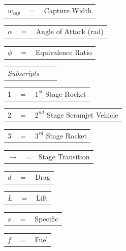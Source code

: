 \documentclass[]{aiaa-tc}
\begin{document}
	  	\begin{tabular}{p{1.2cm}p{1cm}p{5cm}}
	  $w_{cap}$ & $=$ & Capture Width\\
	  	\end{tabular} 
	  	\begin{tabular}{p{1.2cm}p{1cm}p{5cm}}
	  		$\alpha$ & $=$ & Angle of Attack (rad)\\
	  	\end{tabular} 	
	  	\begin{tabular}{p{1.2cm}p{1cm}p{5cm}}
	  		$\phi$ & $=$ & Equivalence Ratio\\
	  	\end{tabular} 
	  	\newline  	
	  	\begin{tabular}{p{5.2cm}p{1cm}p{5cm}}


\textit{Subscripts} \\
\end{tabular} 
\newline
\begin{tabular}{p{1.2cm}p{1cm}p{5cm}}
$1$ & $=$ & $1^{st}$ Stage Rocket\\
\end{tabular} 
\begin{tabular}{p{1.2cm}p{1cm}p{5cm}}
	$2$ & $=$ & $2^{nd}$ Stage Scramjet Vehicle\\
		\end{tabular} 
		\begin{tabular}{p{1.2cm}p{1cm}p{5cm}}
	$3$ & $=$ & $3^{rd}$ Stage Rocket\\
		\end{tabular} 
		\begin{tabular}{p{1.2cm}p{1cm}p{5cm}}
	$\rightarrow$ & = & Stage Transition\\
		\end{tabular} 
		\begin{tabular}{p{1.2cm}p{1cm}p{5cm}}
	$d$ & $=$ & Drag\\
		\end{tabular} 
		\begin{tabular}{p{1.2cm}p{1cm}p{5cm}}
	$L$ & $=$ & Lift\\
		\end{tabular} 
		\begin{tabular}{p{1.2cm}p{1cm}p{5cm}}
	$s$ & $=$ & Specific\\
		\end{tabular} 
		\begin{tabular}{p{1.2cm}p{1cm}p{5cm}}
	$f$ & $=$ & Fuel\\
\end{tabular} 
\end{document}
